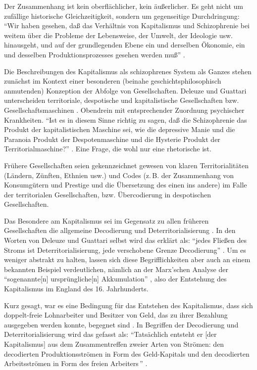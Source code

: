 \documentclass[12pt,
               DIV13,
               paper=a4,
               twoside=false,
               onehalfspacing,
               bibliography=totoc,
               toc=graduated,
               draft,
               ]{scrartcl}
\newcommand{\pc}[2]{\parencite[#1]{#2}}
\newcommand{\vgl}[2]{\parencite[vgl.][#1]{#2}}
\newcommand{\worries}[1]{\ifdraft{\textcolor{blue}{\texttt{(#1)}}}{}}
\newcommand{\dg}{Deleuze und Guattari\xspace}
\begin{document}
Der Zusammenhang ist kein oberflächlicher, kein äußerlicher. Es geht
nicht um zufällige historische Gleichzeitigkeit, sondern um
gegenseitige Durchdringung: "`Wir haben gesehen, daß das Verhältnis
von Kapitalismus und Schizophrenie bei weitem über die Probleme der
Lebensweise, der Umwelt, der Ideologie usw. hinausgeht, und auf der
grundlegenden Ebene ein und derselben Ökonomie, ein und desselben
Produktionsprozesses gesehen werden muß"' \pc{315}{ao}.

Die Beschreibungen des Kapitalismus als schizophrenes System als
Ganzes stehen zunächst im Kontext einer besonderen (beinahe
geschichtsphilosophisch anmutenden) Konzeption der Abfolge von
Gesellschaften. Deleuze und Guattari unterscheiden territoriale,
despotische und kapitalistische Gesellschaften bzw.
Gesellschaftsmaschinen \vgl{338}{ao}. Obendrein mit entsprechender
Zuordnung psychischer Krankheiten. "`Ist es in diesem Sinne richtig zu
sagen, daß die Schizophrenie das Produkt der kapitalistischen Maschine
sei, wie die depressive Manie und die Paranoia Produkt der
Despotenmaschine und die Hysterie Produkt der Territorialmaschine?"'
\pc{44}{ao}. Eine Frage, die wohl nur eine rhetorische ist.

Frühere Gesellschaften seien gekennzeichnet gewesen von klaren
Territorialitäten (Ländern, Zünften, Ethnien usw.) und Codes (z.\,B.
der Zusammenhang von Konsumgütern und Prestige und die Übersetzung des
einen ins andere) \vgl{318, 332}{ao} im Falle der territorialen
Gesellschaften, bzw. Übercodierung \worries{BSP} in despotischen
Gesellschaften.

Das Besondere am Kapitalismus sei im Gegensatz zu allen früheren
Gesellschaften die allgemeine Decodierung und Deterritorialisierung
\vgl{337}{ao}. In den Worten von \dg selbst wird das erklärt als:
"`jedes Fließen des Stroms ist Deterritorialisierung, jede verschobene
Grenze Decodierung"' \pc{298}{ao}. Um es weniger abstrakt zu halten,
lassen sich diese Begrifflichkeiten aber auch an einem bekannten
Beispiel verdeutlichen, nämlich an der Marx'schen Analyse der
"`sogenannte[n] ursprüngliche[n] Akkumulation"' \pc{741}{kap}, also
der Entstehung des Kapitalismus im England des 16. Jahrhunderts.

Kurz gesagt, war es eine Bedingung für das Entstehen des Kapitalismus,
dass sich doppelt-freie Lohnarbeiter und Besitzer von Geld, das zu
ihrer Bezahlung ausgegeben werden konnte, begegnet sind
\vgl{742}{kap}. In Begriffen der Decodierung und Deterritorialisierung
wird das gefasst als: "`Tatsächlich entsteht er [der Kapitalismus] aus
dem Zusammentreffen zweier Arten von Strömen: den decodierten
Produktionsströmen in Form des Geld-Kapitals und den decodierten
Arbeitsströmen in Form des \glq freien Arbeiters\grq\,"' \pc{44}{ao}.
\end{document}
